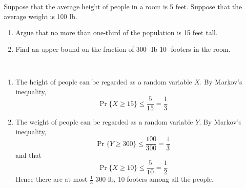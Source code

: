 \begin{exercise}{Suppose that the average height of people in a room is 5 feet. Suppose that the average weight is 100 lb.
  \begin{enumerate}
    \item Argue that no more than one-third of the population is 15 feet tall.
    \item Find an upper bound on the fraction of 300 -Ib 10 -footers in the room.
  \end{enumerate} }
  \begin{solution}
  \par{~}
  \begin{enumerate}
    \item { The height of people can be regarded as a random variable $X$. By Markov’s inequality,
    $$\operatorname{Pr}\{X \geq 15\} \leq \frac{5}{15} = \frac{1}{3}$$
    }
    \item { The weight of people can be regarded as a random variable $Y$. By Markov’s inequality,
    $$\operatorname{Pr}\{Y \geq 300\} \leq \frac{100}{300} = \frac{1}{3}$$}
    and that
    $$\operatorname{Pr}\{X \geq 10\} \leq \frac{5}{10} = \frac{1}{2}$$
    Hence there are at most $\frac{1}{3}$ 300-lb, 10-footers among all the people.
  \end{enumerate}
  \end{solution}
  \label{ex7-9}
\end{exercise}